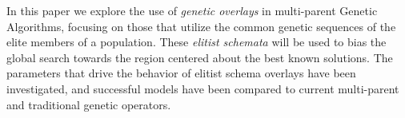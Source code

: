 In this paper we explore the use of \emph{genetic overlays} in multi-parent Genetic Algorithms, focusing on those that utilize the common genetic sequences of the elite members of a population. These \emph{elitist schemata} will be used to bias the global search towards the region centered about the best known solutions. The parameters that drive the behavior of elitist schema overlays have been investigated, and successful models have been compared to current multi-parent and traditional genetic operators.
